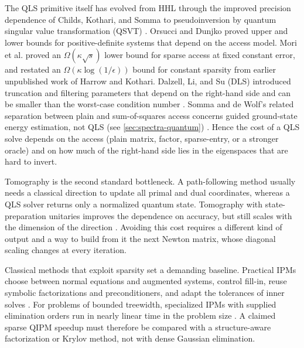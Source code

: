 The QLS primitive itself has evolved from HHL through the improved precision
dependence of Childs, Kothari, and Somma to pseudoinversion by quantum
singular value transformation (QSVT)
\cite{harrow2009-quantum-algorithm-linear-systems-equations,
andrew2017-quantum-algorithm-systems-linear-equations,
andras2019-quantum-singular-value-transformation-beyond}.  Orsucci and Dunjko
proved upper and lower bounds for positive-definite systems that depend on the
access model.  Mori et al. proved an \(\Omega(\kappa\sqrt{s})\) lower bound
for sparse access at fixed constant error, and restated an
\(\Omega(\kappa\log(1/\epsilon))\) bound for constant sparsity from earlier
unpublished work of Harrow and Kothari.  Dalzell, Li, and Su (DLS)
introduced truncation and filtering parameters that depend on the right-hand
side and can be smaller than the worst-case condition number
\cite{orsucci2021-on-solving-classes-of-positive,
mori2026-sparsity-dependent-complexity-lower-bound,
dalzell2026-faster-quantum-linear-system-solver}.  Somma and de Wolf's
related separation between plain and sum-of-squares access concerns guided
ground-state energy estimation, not QLS (see \cref{sec:spectra-quantum})
\cite{somma2026-optimal-lower-bound-ground-state-energy}.  Hence the cost of
a QLS solve depends on the access (plain matrix, factor, sparse-entry, or a
stronger oracle) and on how much of the right-hand side lies in the
eigenspaces that are hard to invert.

Tomography is the second standard bottleneck.  A path-following method
usually needs a classical direction to update all primal and dual
coordinates, whereas a QLS solver returns only a normalized quantum state.
Tomography with state-preparation unitaries improves the dependence on
accuracy, but still scales with the dimension of the direction
\cite{mohammadisiahroudi2023-exponentially-more-precise-tomography-for,
joran2023-quantum-tomography-state-preparation-unitaries}.  Avoiding this
cost requires a different kind of output and a way to build from it the next
Newton matrix, whose diagonal scaling changes at every iteration.

Classical methods that exploit sparsity set a demanding baseline.  Practical
IPMs choose between normal equations and augmented systems, control fill-in,
reuse symbolic factorizations and preconditioners, and adapt the tolerances
of inner solves
\cite{wright1997-primal-dual-interior-point-methods,
jacek2012-interior-point-methods-25-years,
gondzio2023-general-purpose-preconditioning-regularized-interior-point}.
For problems of bounded treewidth, specialized IPMs with supplied elimination
orders run in nearly linear time in the problem size
\cite{dong2020-a-nearly-linear-time-algorithm,
gu2022-a-faster-small-treewidth-sdp}.  A claimed sparse QIPM speedup must
therefore be compared with a structure-aware factorization or Krylov method,
not with dense Gaussian elimination.

